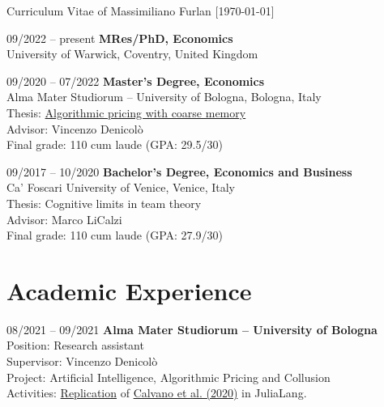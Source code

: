 \documentclass[11pt,a4paper]{article}
\begin{document}
\begin{cv}{\huge Curriculum Vitae of Massimiliano Furlan \normalsize{[\mydatestyle\today]}}
\begin{cvlist}{}
	\item[09/2022 -- \hspace{0.1pt} present] 
		\textbf{MRes/PhD, Economics}\\ 
		University of Warwick, Coventry, United Kingdom
	\item[09/2020 -- 07/2022] 
		\textbf{Master's Degree, Economics}\\ 
		Alma Mater Studiorum -- University of Bologna, Bologna, Italy\\
		Thesis: \href{https://github.com/massimilianofurlan/algorithmic_pricing/tree/coarse_memory}{Algorithmic pricing with coarse memory}\\
		Advisor: Vincenzo Denicolò\\
		Final grade: 110 cum laude \quad (GPA: 29.5/30)
	\item[09/2017 -- 10/2020] 
		\textbf{Bachelor's Degree, Economics and Business}\\
		Ca' Foscari University of Venice, Venice, Italy\\
		Thesis: Cognitive limits in team theory\\
		Advisor: Marco LiCalzi\\
		Final grade: 110 cum laude \quad (GPA: 27.9/30)	
\end{cvlist}
\vspace{-20pt}

\section{Academic Experience}

\begin{cvlist}{}
	\item[08/2021 -- 09/2021]
		\textbf{Alma Mater Studiorum – University of Bologna}\\
		Position: Research assistant\\
		Supervisor: Vincenzo Denicolò\\
		Project: Artificial Intelligence, Algorithmic Pricing and Collusion\\
		Activities: \href{https://github.com/massimilianofurlan/algorithmic_pricing}{Replication} of \href{https://www.aeaweb.org/articles?id=10.1257/aer.20190623}{Calvano et al. (2020)} in JuliaLang.
\end{cvlist}
\vspace{-20pt}


\end{cv}
\end{document}
